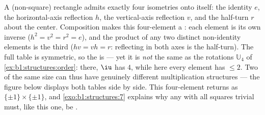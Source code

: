 \begin{example}\label{ex:b1:structures:klein}
A (non-square) rectangle admits exactly four isometries onto
itself: the identity $e$, the horizontal-axis reflection $h$, the
vertical-axis reflection $v$, and the half-turn $r$ about the
center. Composition makes this four-element  a : each
element is its own inverse ($h^2 = v^2 = r^2 = e$), and the
product of any two distinct non-identity elements is the third
($hv = vh = r$: reflecting in both axes is the half-turn). The
full table is symmetric, so the  is  --- yet it is
\emph{not} the same  as the rotations $\mathbb U_4$ of
\cref{ex:b1:structures:order}: there, $\iu$ has  $4$, while
here every element has  $\leq 2$. Two  of the same
size can thus have genuinely different multiplication structures
--- the figure below displays both tables side by side. This
four-element  returns as $\{\pm1\} \times \{\pm1\}$, and
\cref{exo:b1:structures:7} explains why any  with all
squares trivial must, like this one, be .
\end{example}

